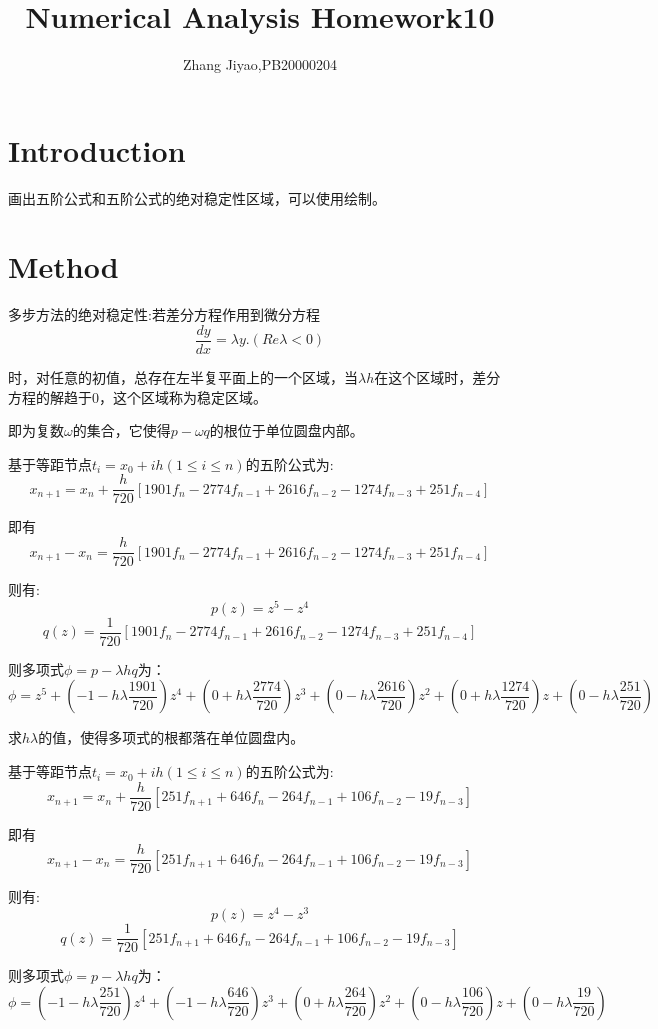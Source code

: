 \documentclass{article}
\title{Numerical Analysis Homework10}
\author{Zhang Jiyao,PB20000204}
\begin{document}
	\maketitle
	
	\section{Introduction}
   
   画出五阶公式和五阶公式的绝对稳定性区域，可以使用绘制。

	\section{Method}
	
	多步方法的绝对稳定性:若差分方程作用到微分方程
	$$ \frac{dy}{dx}=\lambda y.(Re\lambda <0)$$
	
	时，对任意的初值，总存在左半复平面上的一个区域，当$\lambda h$在这个区域时，差分方程的解趋于0，这个区域称为稳定区域。
	
	即为复数$\omega$的集合，它使得$p-\omega q$的根位于单位圆盘内部。
	
	基于等距节点$t_i=x_0+ih(1\leq i \leq n)$的五阶公式为:
	$$ x_{n+1}=x_n+\frac{h}{720}[1901f_n-2774f_{n-1}+2616f_{n-2}-1274f_{n-3}+251f_{n-4}]$$
	
	即有
	$$ x_{n+1}-x_n=\frac{h}{720}[1901f_n-2774f_{n-1}+2616f_{n-2}-1274f_{n-3}+251f_{n-4}]$$
	
	则有:
	$$ p(z)=z^5-z^4$$
	$$ q(z)=\frac{1}{720}[1901f_n-2774f_{n-1}+2616f_{n-2}-1274f_{n-3}+251f_{n-4}]$$
	
	则多项式$\phi=p-\lambda hq$为：
	$$ \phi=z^5+(-1-h\lambda \frac{1901}{720})z^4+(0+h\lambda \frac{2774}{720})z^3+(0-h\lambda \frac{2616}{720})z^2+(0+h\lambda \frac{1274}{720})z+(0-h\lambda \frac{251}{720})$$
	
	求$h\lambda$的值，使得多项式的根都落在单位圆盘内。
	
	基于等距节点$t_i=x_0+ih(1\leq i \leq n)$的五阶公式为:
	$$ x_{n+1}=x_n+\frac{h}{720}[251f_{n+1}+646f_{n}-264f_{n-1}+106f_{n-2}-19f_{n-3}]$$
	
	即有
	$$ x_{n+1}-x_n=\frac{h}{720}[251f_{n+1}+646f_{n}-264f_{n-1}+106f_{n-2}-19f_{n-3}]$$
	
	则有:
	$$ p(z)=z^4-z^3$$
	$$ q(z)=\frac{1}{720}[251f_{n+1}+646f_{n}-264f_{n-1}+106f_{n-2}-19f_{n-3}]$$
	
	则多项式$\phi=p-\lambda hq$为：
	$$ \phi=(-1-h\lambda \frac{251}{720})z^4+(-1-h\lambda \frac{646}{720})z^3+(0+h\lambda \frac{264}{720})z^2+(0-h\lambda \frac{106}{720})z+(0-h\lambda \frac{19}{720})$$
	
\end{document}
